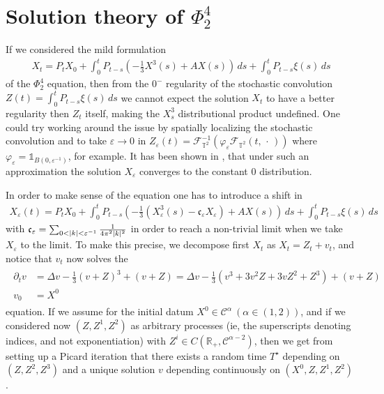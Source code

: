 \documentclass{report}
\newcommand{\RR}{\mathbb{R}}
\newcommand{\TT}{\mathbb{T}}
\DeclarePairedDelimiter\abs{\lvert}{\rvert} %
\newcommand{\CharFunction}[1]{\mathds{1}_{#1}}
\newcommand{\Placeholder}{\,\mathrel{\cdot}\,}
\theoremstyle{remark}
\theoremstyle{definition}
\let\phi\varphi
\let\epsilon\varepsilon
\begin{document}
\chapter{Solution theory of $\Phi^4_2$}
If we considered the mild formulation 
\begin{align}
  X_t = P_t X_0 + \int_{0}^{t}P_{t-s}\left(-\frac{1}{3}X^3(s) + A X(s)\right)\,ds + \int_0^t P_{t-s} \xi(s) \,ds
\end{align}
of the $\Phi^4_2$ equation, then from the $0^-$ regularity of the stochastic convolution $Z(t) = \int_0^t P_{t-s} \xi(s) \,ds$ we cannot expect the solution $X_t$ to have a better regularity then $Z_t$ itself, making the $X^3_s$ distributional product undefined. One could try working around the issue by spatially localizing the stochastic convolution and to take $\epsilon \to 0$ in $Z_\epsilon(t) = \mathcal{F}_{\TT^2}^{-1}(\phi_\epsilon \mathcal{F}_{\TT^2}(t, \Placeholder))$ where $\phi_\epsilon = \CharFunction{B(0, \epsilon^{-1})}$, for example. It has been shown in \cite{hairer2012triviality}, that under such an approximation the solution $X_\epsilon$ converges to the constant $0$ distribution.

In order to make sense of the equation one has to introduce a shift in
\begin{align}
  X_\epsilon(t) = P_t X_0 + \int_{0}^{t}P_{t-s}\left(-\frac{1}{3}\left(X^3_\epsilon(s) - \mathfrak{c}_\epsilon X_\epsilon\right)+ A X(s)\right)\,ds + \int_0^t P_{t-s} \xi(s) \,ds
\end{align}
with $\mathfrak{c}_\epsilon = \sum_{0 < \abs{k} < \epsilon^{-1}} \frac{1}{4 \pi^2 \abs{k}^2}$ in order to reach a non-trivial limit when we take $X_\epsilon$ to the limit. To make this precise, we decompose first $X_t$ as $X_t = Z_t + v_t$, and notice that $v_t$ now solves the 
\begin{align}
  \label{eq:phi_eq_in_v}
  \begin{split}
    \partial_t v &= \Delta v - \frac{1}{3}(v + Z)^3 + (v + Z) = \Delta v - \frac{1}{3}(v^3 + 3v^2 Z + 3v Z^2 + Z^3) + (v+Z)\\
    v_0 &= X^0
  \end{split}
\end{align}
equation. If we assume for the initial datum $X^0 \in \mathcal{C}^\alpha~(\alpha \in (1, 2))$, and if we considered now $(Z, Z^1, Z^2)$ as arbitrary processes (ie, the superscripts denoting indices, and not exponentiation) with $Z^i \in {C}(\RR_+, \mathcal{C}^{\alpha-2})$, then we get from setting up a Picard iteration that there exists a random time $T^\star$ depending on $(Z, Z^2, Z^3)$ and a unique solution $v$ depending continuously on $(X^0, Z, Z^1, Z^2)$ \cite[Theorem 4.10.]{perkowski2024stochaIV}.
\end{document}
